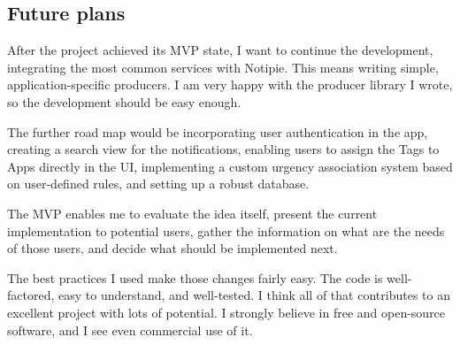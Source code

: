 \subsection{Future plans}\label{sec:future-plans}

After the project achieved its \ac{MVP} state,
I want to continue the development,
integrating the most common services
with Notipie.
This means writing simple,
application-specific producers.
I am very happy with the producer library I wrote,
so the development should be easy enough.

The further road map would be
incorporating user authentication in the app,
creating a search view for the notifications,
enabling users to assign the Tags to Apps
directly in the \ac{UI},
implementing a custom urgency association system
based on user-defined rules,
and setting up a robust database.

The \ac{MVP} enables me to evaluate the idea itself,
present the current implementation to potential users,
gather the information on what are the needs
of those users,
and decide what should be implemented next.

The best practices I used make those changes
fairly easy.
The code is well-factored,
easy to understand,
and well-tested.
I think all of that contributes
to an excellent project
with lots of potential.
I strongly believe in
free and open-source software,
and I see even commercial use of it.
